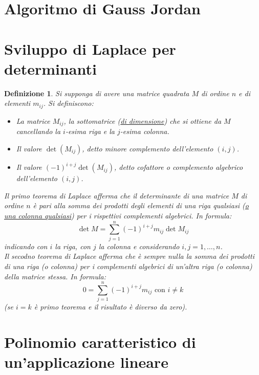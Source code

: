 \documentclass{article}
\newtheorem{defi}{Definizione}[section]
\begin{document}
\section{Algoritmo di Gauss Jordan}
\label{sec:algoritmodigauss}

\section{Sviluppo di Laplace per determinanti}
\label{sec:laplace}
\begin{defi}
  Si supponga di avere una matrice quadrata $M$ di ordine $n$ e di elementi
  $m_{ij}$. Si definiscono:
  \begin{itemize}
  \item La matrice $M_{ij}$, la sottomatrice (\underline{di dimensione}) che si
    ottiene da $M$ cancellando la $i$-esima riga e la $j$-esima colonna.
  \item Il valore $\det (M_{ij})$, detto minore complemento dell'elemento
    $(i,j)$.
  \item Il valore $(-1)^{i+j}\det(M_{ij})$, detto cofattore o complemento
    algebrico dell'elemento $(i,j)$.
  \end{itemize}
  Il primo teorema di Laplace afferma che il determinante di una matrice $M$
  di ordine $n$ è pari alla somma dei prodotti degli elementi di una riga
  qualsiasi (\underline{o una colonna qualsiasi}) per i rispettivi complementi
  algebrici. In formula:
  \begin{equation}
    \label{eq:primaform}
    \det M = \sum\limits_{j=1}^{n}(-1)^{i+j}m_{ij}\det M_{ij}
  \end{equation}
  indicando con $i$ la riga, con $j$ la colonna e considerando
  $i,j=1,\dots,n$.\\
  Il secodno teorema di Laplace afferma che è sempre nulla la somma dei
  prodotti di una riga (o colonna) per i complementi algebrici di un'altra riga
  (o colonna) della matrice stessa. In formula:
  \begin{equation}
    \label{eq:secondformula}
    0=\sum_{j=1}^n(-1)^{i+j} m_{ij} \text{ con } i\neq k
  \end{equation}
  (se $i = k$ è primo teorema e il risultato è diverso da zero).
\end{defi}
\section{Polinomio caratteristico di un'applicazione lineare}
\label{sec:polinomicaratteristici}
\end{document}
